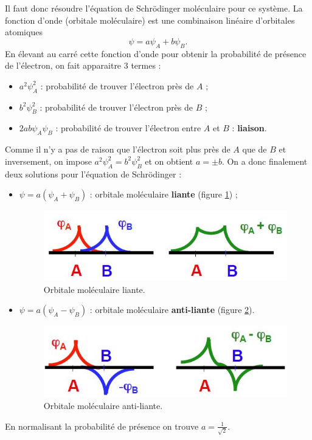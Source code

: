 Il faut donc résoudre l'équation de Schrödinger
moléculaire pour ce système. La fonction d'onde (orbitale moléculaire)
est une combinaison linéaire d'orbitales atomiques
\[ \psi = a\psi_A + b\psi_B. \]
En élevant au carré cette fonction d'onde pour
obtenir la probabilité de présence de l'électron, on
fait apparaitre 3 termes :
\begin{itemize}
	\item $a^2\psi_A^2$ : probabilité de trouver l'électron
	près de $A$ ;
	\item $b^2\psi_B^2$ : probabilité de trouver l'électron
	près de $B$ ;
	\item $2ab\psi_A\psi_B$ : probabilité de trouver l'électron
	entre $A$ et $B$ : \textbf{liaison}.
\end{itemize}
Comme il n'y a pas de raison que l'électron soit plus près
de $A$ que de $B$ et inversement, on impose $a^2\psi_A^2=b^2\psi_B^2$
et on obtient $a = \pm b$. On a donc finalement
deux solutions pour l'équation de Schrödinger :
\begin{itemize}
	\item $\psi = a(\psi_A+\psi_B)$ : orbitale moléculaire \textbf{liante}
	(figure \ref{fig:liante}) ;
	\begin{figure}[ht]
		\centering
		\includegraphics[scale=0.8]{img/orb-liante.jpg}
		\caption{Orbitale moléculaire liante.}
		\label{fig:liante}
	\end{figure}
	\item $\psi = a(\psi_A-\psi_B)$ : orbitale moléculaire
	\textbf{anti-liante} (figure \ref{fig:anti-liante}).
	\begin{figure}[ht]
		\centering
		\includegraphics[scale=0.8]{img/orb-anti-liante.jpg}
		\caption{Orbitale moléculaire anti-liante.}
		\label{fig:anti-liante}
	\end{figure}
\end{itemize}
En normalisant la probabilité de présence on trouve $a = \frac{1}{\sqrt{2}}$.

